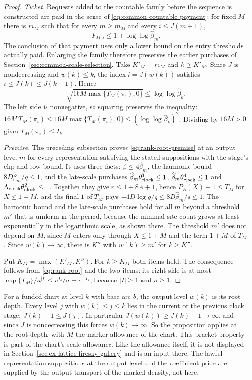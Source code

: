 \begin{proof}
\emph{Ticket.} Requests added to the countable family before the
sequence is constructed are paid in the sense of
\eqref{eq:common-countable-payment}: for fixed $M$ there is $m_M$ such
that for every $m\ge m_M$ and every $i\le J(m+1)$,
\[
 F_{M,i}\le1+\log\log\widehat\beta_m .
\]
The conclusion of that payment uses only a lower bound on the entry
thresholds actually paid. Enlarging the family therefore preserves the
earlier purchases of Section~\ref{sec:common-scale-selection}. Take
$K'_M=m_M$ and $k\ge K'_M$. Since $J$ is nondecreasing and $w(k)\le k$,
the index $i=J(w(k))$ satisfies $i\le J(k)\le J(k+1)$. Hence
\[
 \sqrt{16M\max\{T_M(\pi_i),0\}}\le\log\log\widehat\beta_k .
\]
The left side is nonnegative, so squaring preserves the inequality:
$16M\,T_M(\pi_i)\le16M\max\{T_M(\pi_i),0\}\le(\log\log\widehat\beta_k)^2$.
Dividing by $16M>0$ gives $T_M(\pi_i)\le I_k$.

\emph{Premise.} The preceding subsection proves
\eqref{eq:rank-root-premise} at an output level $m$ for every
representation satisfying the stated suppositions with the stage's clip
and row bound. It uses three facts: $\beta\le4\widehat\beta_m$, the
harmonic bound $8D\widehat\beta_m/q\le1$, and the late-scale purchases
$\widehat\beta_m\theta_{\rm clock}^3\le1$,
$\widehat\beta_m\theta_{\rm clock}^4\le1$ and
$\Lambda_{\rm clock}\theta_{\rm clock}^2\le1$. Together they give
$r\le1+8A+1$, hence $P_R(X)+1\le T_M$ for $X\le1+M$, and the final $1$ of
$T_M$ pays $-4D\log g/q\le8D\widehat\beta_m/q\le1$. The harmonic bound and
the late-scale purchases hold for all $m$ beyond a threshold $m'$ that is
uniform in the period, because the minimal site count grows at least
exponentially in the logarithmic scale, as shown there. The threshold
$m'$ does not depend on $M$, since $M$ enters only through $X\le1+M$
and the term $1+M$ of $T_M$. Since $w(k)\to\infty$, there is $K''$ with
$w(k)\ge m'$ for $k\ge K''$.

Put $K_M=\max(K'_M,K'')$. For $k\ge K_M$ both items hold. The
consequence follows from \eqref{eq:rank-root} and the two items: its
right side is at most $\exp\{T_M\}/a^{|I|}\le e^{I_k}/a=e^{-I_k}$,
because $|I|\ge1$ and $a\ge1$.
\end{proof}

For a funded chart at level $k$ with base arc $b$, the output level
$w(k)$ is its root depth. Every level $j$ with $w(k)\le j\le k$ lies in
the current or the previous clock stage: $J(k)-1\le J(j)$. In
particular $J(w(k))\ge J(k)-1\to\infty$, and since $J$ is nondecreasing
this forces $w(k)\to\infty$. So the proposition applies at the root
depth, with $M$ the marker allowance of the chart. This bracket property
is part of the chart's scale allowance. Like the allowance itself, it
is not displayed in Section~\ref{sec:ex-lattice-firesky-gallery} and is
an input there. The lawful-representation suppositions at the output
level and the coefficient price are supplied by the output transport of
the marked density, not here.

